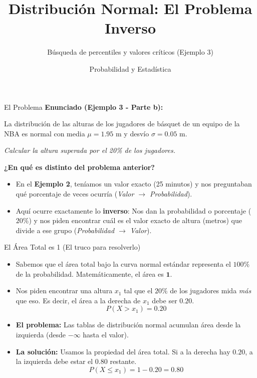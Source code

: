 \documentclass[11pt, aspectratio=169]{beamer}
\title{Distribución Normal: El Problema Inverso}
\subtitle{Búsqueda de percentiles y valores críticos (Ejemplo 3)}
\author{Probabilidad y Estadística}
\date{}
\begin{document}
\begin{frame}
    \titlepage
\end{frame}

\begin{frame}{El Problema}
    \textbf{Enunciado (Ejemplo 3 - Parte b):}
    \vspace{0.3cm}
    
    La distribución de las alturas de los jugadores de básquet de un equipo de la NBA es normal con media $\mu = 1.95$ m y desvío $\sigma = 0.05$ m.
    
    \vspace{0.3cm}
    \textit{Calcular la altura superada por el 20\% de los jugadores.}
    
    \vspace{0.5cm}
    \textbf{¿En qué es distinto del problema anterior?}
    \begin{itemize}
        \item En el \textbf{Ejemplo 2}, teníamos un valor exacto (25 minutos) y nos preguntaban qué porcentaje de veces ocurría (\textit{Valor $\rightarrow$ Probabilidad}).
        \item Aquí ocurre exactamente lo \textbf{inverso}: Nos dan la probabilidad o porcentaje ($20\%$) y nos piden encontrar cuál es el valor exacto de altura (metros) que divide a ese grupo (\textit{Probabilidad $\rightarrow$ Valor}).
    \end{itemize}
\end{frame}

\begin{frame}{El Área Total es 1 (El truco para resolverlo)}
    \begin{itemize}
        \item Sabemos que el área total bajo la curva normal estándar representa el $100\%$ de la probabilidad. Matemáticamente, el área es $\mathbf{1}$.
        \item Nos piden encontrar una altura $x_1$ tal que el $20\%$ de los jugadores mida \textit{más} que eso. Es decir, el área a la derecha de $x_1$ debe ser $0.20$.
        \begin{equation*}
            P(X > x_1) = 0.20
        \end{equation*}
        \item \textbf{El problema:} Las tablas de distribución normal acumulan área desde la izquierda (desde $-\infty$ hasta el valor).
        \item \textbf{La solución:} Usamos la propiedad del área total. Si a la derecha hay $0.20$, a la izquierda debe estar el $0.80$ restante.
        \begin{equation*}
            P(X \le x_1) = 1 - 0.20 = \mathbf{0.80}
        \end{equation*}
    \end{itemize}
\end{frame}
\end{document}
